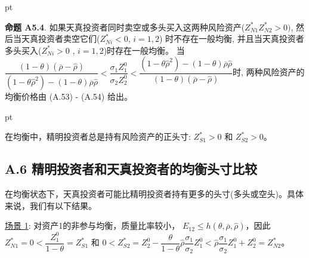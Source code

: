 \documentclass[10.0pt]{article}
\begin{document}
 pt

{\bf 命题 A5.4}. 如果天真投资者同时卖空或多头买入这两种风险资产($ Z_{N 1}^* Z_{N 2}^* > 0) $, 然后当天真投资者卖空它们($ Z_{N i}^* < 0 $, $ i = 1, 2 $) 时不存在一般均衡, 并且当天真投资者多头买入($ Z_{N i}^* > 0 $ , $ i = 1, 2 $)时存在一般均衡。 当 $ \dfrac{(1 - \theta) (\overline{\rho} - {\hat \rho})}{(1 - \theta {\hat \rho}^2) - (1 - \theta) \overline{\rho} {\hat \rho}} < \dfrac{\sigma_1 Z_1^0}{\sigma_2 Z_2^0} < \dfrac{(1 - \theta {\hat \rho}^2) - (1 - \theta) \overline{\rho} {\hat \rho}}{(1 - \theta) (\overline{\rho} - {\hat \rho})} $时, 两种风险资产的均衡价格由 (A.53) - (A.54) 给出。


 pt

在均衡中，精明投资者总是持有风险资产的正头寸: $ Z_{S 1}^* > 0 $ 和 $ Z_{S 2}^* > 0 $。 


\subsection*{A.6 \quad  精明投资者和天真投资者的均衡头寸比较}

\quad

在均衡状态下，天真投资者可能比精明投资者持有更多的头寸(多头或空头)。具体来说，我们有以下结果。

\underline{场景 1}: 对资产1的非参与均衡，质量比率较小， $ E_{1 2} \leqslant h (\theta, \overline{\rho}, {\hat \rho}) $，因此 $ Z_{N 1}^* = 0 < \dfrac{Z_1^0}{1 - \theta} = Z_{S 1}^* $ 和 $ 0 < Z_{S 2}^* = Z_2^0 - \dfrac{\theta}{1 - \theta} {\hat \rho} \dfrac{\sigma_1}{\sigma_2} Z_1^0 < {\hat \rho} \dfrac{\sigma_1}{\sigma_2} Z_1^0 + Z_2^0 = Z_{N 2}^* $。
\end{document}
